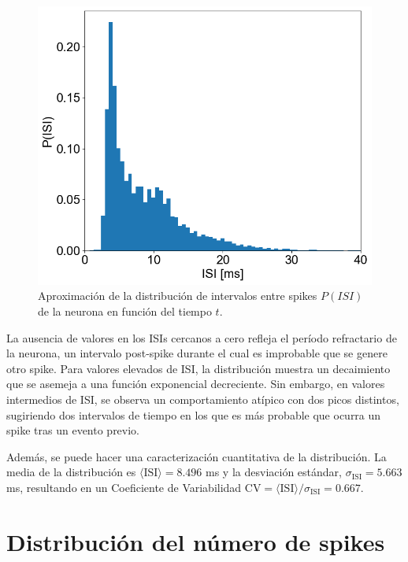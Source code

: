 \documentclass[aps,prb,twocolumn,superscriptaddress,floatfix,longbibliography]{revtex4-2}
\begin{document}
\begin{figure}[h]
  \includegraphics[clip=true,width=\columnwidth]{ISI_histogram.png}
  \caption{Aproximación de la distribución de intervalos entre spikes $P(ISI)$ de la neurona en función del tiempo $t$.}
   \label{fig:ISI_histogram}
\end{figure}

La ausencia de valores en los ISIs cercanos a cero refleja el período refractario de la neurona, un intervalo post-spike durante el cual es improbable que se genere otro spike. Para valores elevados de ISI, la distribución muestra un decaimiento que se asemeja a una función exponencial decreciente. Sin embargo, en valores intermedios de ISI, se observa un comportamiento atípico con dos picos distintos, sugiriendo dos intervalos de tiempo en los que es más probable que ocurra un spike tras un evento previo.

Además, se puede hacer una caracterización cuantitativa de la distribución. La media de la distribución es $\langle \mathrm{ISI} \rangle = 8.496$ ms y la desviación estándar, $\sigma_{\mathrm{ISI}} = 5.663$ ms, resultando en un Coeficiente de Variabilidad $\mathrm{CV} = \langle \mathrm{ISI} \rangle / \sigma_{\mathrm{ISI}} =  0.667$.

\section{Distribución del número de spikes}
\end{document}
